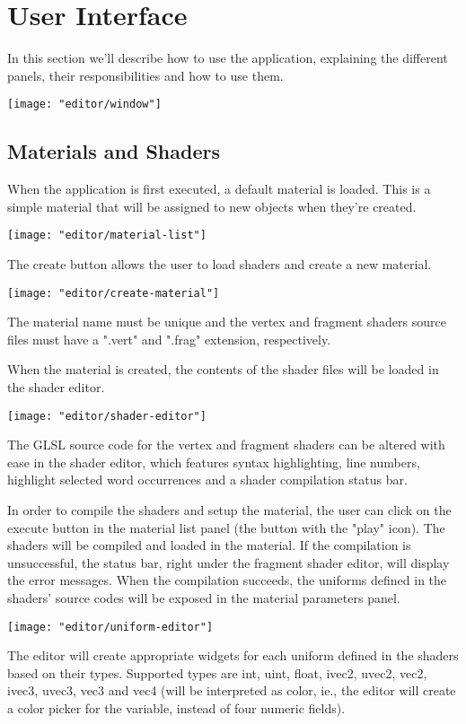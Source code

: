 \section{User Interface}
In this section we'll describe how to use the application, explaining the different panels, their responsibilities and how to use them.

\texttt{[image: "editor/window"]}

\subsection{Materials and Shaders}
When the application is first executed, a default material is loaded. This is a simple material that will be assigned to new objects when they're created.

\texttt{[image: "editor/material-list"]}

The create button allows the user to load shaders and create a new material.

\texttt{[image: "editor/create-material"]}

The material name must be unique and the vertex and fragment shaders source files must have a ".vert" and ".frag" extension, respectively.

When the material is created, the contents of the shader files will be loaded in the shader editor.

\texttt{[image: "editor/shader-editor"]}

The GLSL source code for the vertex and fragment shaders can be altered with ease in the shader editor, which features syntax highlighting, line numbers, highlight selected word occurrences and a shader compilation status bar.

In order to compile the shaders and setup the material, the user can click on the execute button in the material list panel (the button with the "play" icon). The shaders will be compiled and loaded in the material. If the compilation is unsuccessful, the status bar, right under the fragment shader editor, will display the error messages. When the compilation succeeds, the uniforms defined in the shaders' source codes will be exposed in the material parameters panel.

\texttt{[image: "editor/uniform-editor"]}

The editor will create appropriate widgets for each uniform defined in the shaders based on their types. Supported types are int, uint, float, ivec2, uvec2, vec2, ivec3, uvec3, vec3 and vec4 (will be interpreted as color, ie., the editor will create a color picker for the variable, instead of four numeric fields).

